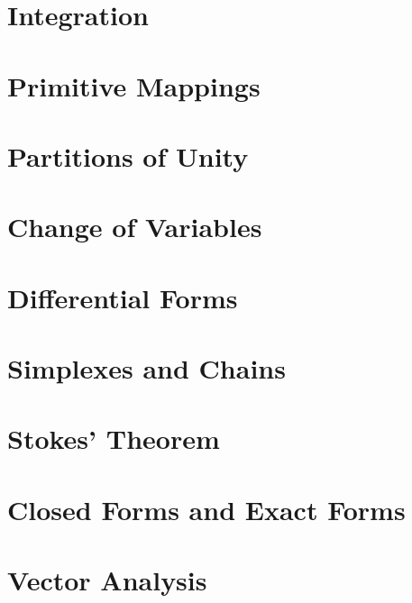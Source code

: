 
\section{Integration}\label{sec:integration}


\section{Primitive Mappings}\label{sec:primitive-mappings}


\section{Partitions of Unity}\label{sec:partitions-of-unity}


\section{Change of Variables}\label{sec:change-of-variables}


\section{Differential Forms}\label{sec:differential-forms}


\section{Simplexes and Chains}\label{sec:simplexes-and-chains}


\section{Stokes' Theorem}\label{sec:stokes-theorem}


\section{Closed Forms and Exact Forms}\label{sec:closed-forms-and-exact-forms}


\section{Vector Analysis}\label{sec:vector-analysis}

